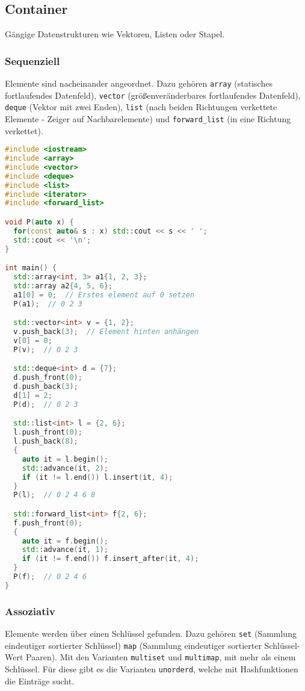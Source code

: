 \subsection{Container}

Gängige Datenstrukturen wie Vektoren, Listen oder Stapel.

\subsubsection{Sequenziell}

Elemente sind nacheinander angeordnet. Dazu gehören \lstinline|array|
(statisches fortlaufendes Datenfeld), \lstinline|vector| (größenveränderbares
fortlaufendes Datenfeld), \lstinline|deque| (Vektor mit zwei Enden),
\lstinline|list| (nach beiden Richtungen verkettete Elemente - Zeiger auf
Nachbarelemente) und \lstinline|forward_list| (in eine Richtung verkettet).

\begin{lstlisting}[language=C++]
#include <iostream>
#include <array>
#include <vector>
#include <deque>
#include <list>
#include <iterator>
#include <forward_list>

void P(auto x) {
  for(const auto& s : x) std::cout << s << ' ';
  std::cout << '\n';
}

int main() {
  std::array<int, 3> a1{1, 2, 3};
  std::array a2{4, 5, 6};
  a1[0] = 0;  // Erstes element auf 0 setzen
  P(a1);  // 0 2 3

  std::vector<int> v = {1, 2};
  v.push_back(3);  // Element hinten anhängen
  v[0] = 0;
  P(v);  // 0 2 3

  std::deque<int> d = {7};
  d.push_front(0);
  d.push_back(3);
  d[1] = 2;
  P(d);  // 0 2 3

  std::list<int> l = {2, 6};
  l.push_front(0);
  l.push_back(8);
  {
    auto it = l.begin();
    std::advance(it, 2);
    if (it != l.end()) l.insert(it, 4);
  }
  P(l);  // 0 2 4 6 8

  std::forward_list<int> f{2, 6};
  f.push_front(0);
  {
    auto it = f.begin();
    std::advance(it, 1);
    if (it != f.end()) f.insert_after(it, 4);
  }
  P(f);  // 0 2 4 6
}
\end{lstlisting}

\subsubsection{Assoziativ}

Elemente werden über einen Schlüssel gefunden. Dazu gehören \lstinline|set|
(Sammlung eindeutiger sortierter Schlüssel) \lstinline|map| (Sammlung
eindeutiger sortierter Schlüssel-Wert Paaren). Mit den Varianten
\lstinline|multiset| und \lstinline|multimap|, mit mehr als einem Schlüssel. Für
diese gibt es die Varianten \lstinline|unorderd|, welche mit Hashfunktionen die
Einträge sucht.

